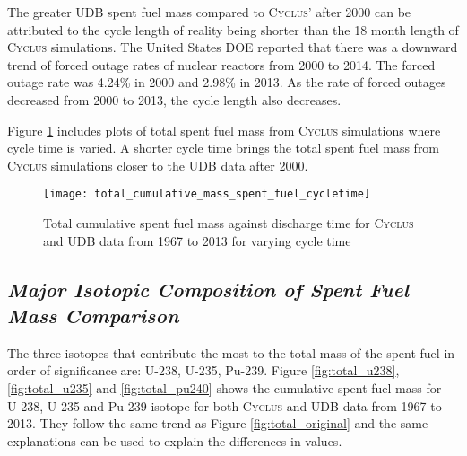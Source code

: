 \documentclass{anstrans}
\newcommand{\Cyclus}{\textsc{Cyclus}\xspace}%
\begin{document}
The greater UDB spent fuel mass compared to \Cyclus' after 2000 can be attributed to the cycle length of reality being shorter than the 18 month length of \Cyclus simulations. The United States DOE reported that there was a downward trend of forced outage rates of nuclear reactors from 2000 to 2014. The forced outage rate was 4.24\% in 2000 and 2.98\% in 2013. As the rate of forced outages decreased from 2000 to 2013, the cycle length also decreases. 

Figure \ref{fig:total_cycletime} includes plots of total spent fuel mass from \Cyclus simulations where cycle time is varied. A shorter cycle time brings the total spent fuel mass from \Cyclus simulations closer to the UDB data after 2000. 

\begin{figure}[ht] %
	\centering
	\texttt{[image: total\_cumulative\_mass\_spent\_fuel\_cycletime]}
	\caption{Total cumulative spent fuel mass against discharge time for \Cyclus and UDB data from 1967 to 2013 for varying cycle time}
	\label{fig:total_cycletime}
\end{figure} 

\subsection{\textit{Major Isotopic Composition of  Spent Fuel Mass Comparison}}
The three isotopes that contribute the most to the total mass of the spent fuel in order of significance are: U-238, U-235, Pu-239.  %
Figure \ref{fig:total_u238}, \ref{fig:total_u235} and \ref{fig:total_pu240} shows the cumulative spent fuel mass for U-238, U-235 and Pu-239 isotope for both \Cyclus and UDB data from 1967 to 2013.
They follow the same trend as Figure \ref{fig:total_original} and the same explanations can be used to explain the differences in values. 
\end{document}
